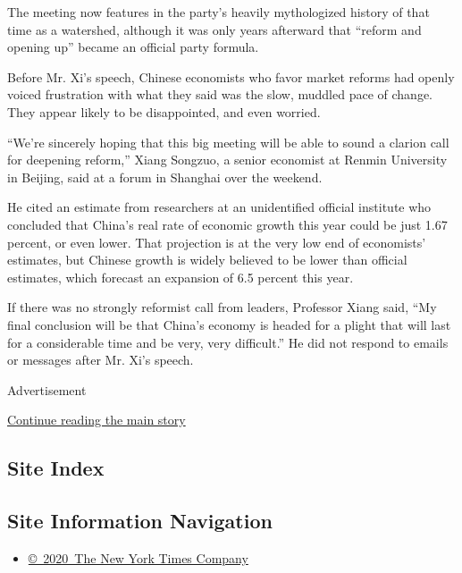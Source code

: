 The meeting now features in the party's heavily mythologized history of
that time as a watershed, although it was only years afterward that
``reform and opening up'' became an official party formula.

Before Mr. Xi's speech, Chinese economists who favor market reforms had
openly voiced frustration with what they said was the slow, muddled pace
of change. They appear likely to be disappointed, and even worried.

``We're sincerely hoping that this big meeting will be able to sound a
clarion call for deepening reform,'' Xiang Songzuo, a senior economist
at Renmin University in Beijing, said at a forum in Shanghai over the
weekend.

He cited an estimate from researchers at an unidentified official
institute who concluded that China's real rate of economic growth this
year could be just 1.67 percent, or even lower. That projection is at
the very low end of economists' estimates, but Chinese growth is widely
believed to be lower than official estimates, which forecast an
expansion of 6.5 percent this year.

If there was no strongly reformist call from leaders, Professor Xiang
said, ``My final conclusion will be that China's economy is headed for a
plight that will last for a considerable time and be very, very
difficult.'' He did not respond to emails or messages after Mr. Xi's
speech.

Advertisement

\protect\hyperlink{after-bottom}{Continue reading the main story}

\hypertarget{site-index}{%
\subsection{Site Index}\label{site-index}}

\hypertarget{site-information-navigation}{%
\subsection{Site Information
Navigation}\label{site-information-navigation}}

\begin{itemize}
\tightlist
\item
  \href{https://help.nytimes.com/hc/en-us/articles/115014792127-Copyright-notice}{©~2020~The
  New York Times Company}
\end{itemize}

